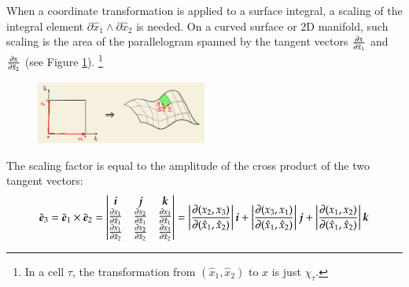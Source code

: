 \documentclass[11pt, a4paper]{article}
\begin{document}
When a coordinate transformation is applied to a surface integral, a scaling of the
integral element $\partial \hat{x}_1 \wedge \partial \hat{x}_2$ is needed. On a curved
surface or 2D manifold, such scaling is the area of the parallelogram spanned by the
tangent vectors $\frac{\partial x}{\partial \hat{x}_1}$ and
$\frac{\partial x}{\partial \hat{x}_2}$ (see Figure \ref{fig:surface-element-scaling}).
\footnote{In a cell $\tau$, the transformation from $(\hat{x}_1, \hat{x}_2)$ to $x$ is
  just $\chi_{\tau}$.}
\begin{figure}[htbp]
  \centering
  \includegraphics[width=0.5\textwidth, height=\textheight, keepaspectratio]{figures/surface-element-scaling-draft}
  \caption{}
  \label{fig:surface-element-scaling}
\end{figure}
The scaling factor is equal to the amplitude of the cross product of the two tangent
vectors:
\begin{equation}
  \tilde{\boldsymbol{e}}_3=\tilde{\boldsymbol{e}}_1\times\tilde{\boldsymbol{e}}_2=\left\vert\begin{matrix}
      \boldsymbol{i} & \boldsymbol{j} & \boldsymbol{k} \\
      \frac{\partial x_{1}}{\partial \hat{x}_{1}} & \frac{\partial x_{2}}{\partial \hat{x}_{1}} & \frac{\partial
        x_{3}}{\partial \hat{x}_{1}} \\
      \frac{\partial x_{1}}{\partial \hat{x}_{2}} & \frac{\partial x_{2}}{\partial \hat{x}_{2}} & \frac{\partial
        x_{3}}{\partial \hat{x}_{2}}
    \end{matrix}\right\vert=
  \left\vert\frac{\partial (x_{2},x_{3})}{\partial (\hat{x}_1,\hat{x}_2)}\right\vert \boldsymbol{i} +
  \left\vert\frac{\partial (x_{3},x_{1})}{\partial (\hat{x}_1,\hat{x}_2)}\right\vert \boldsymbol{j} +
  \left\vert\frac{\partial (x_{1},x_{2})}{\partial (\hat{x}_1,\hat{x}_2)}\right\vert \boldsymbol{k}
\end{equation}
\end{document}
